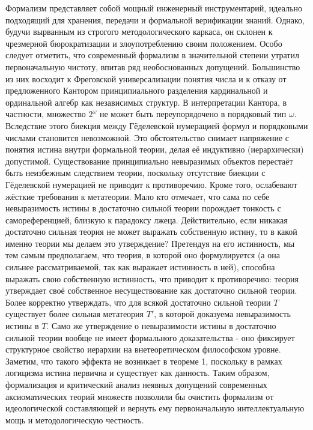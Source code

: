 \documentclass[12pt]{article}
\begin{document}
Формализм представляет собой мощный инженерный инструментарий, идеально подходящий для хранения, передачи и формальной верификации знаний. Однако, будучи вырванным из строгого методологического каркаса, он склонен к чрезмерной бюрократизации и злоупотреблению своим положением. Особо следует отметить, что современный формализм в значительной степени утратил первоначальную чистоту, впитав ряд необоснованных допущений. Большинство из них восходит к Фреговской универсализации понятия числа и к отказу от предложенного Кантором принципиального разделения кардинальной и ординальной алгебр как независимых структур. В интерпретации Кантора, в частности, множество $2^\omega$ не может быть переупорядочено в порядковый тип $\omega$. Вследствие этого биекция между Гёделевской нумерацией формул и порядковыми числами становится невозможной. Это обстоятельство снимает напряжение с понятия истина внутри формальной теории, делая её индуктивно (иерархически) допустимой. Существование принципиально невыразимых объектов перестаёт быть неизбежным следствием теории, поскольку отсутствие биекции с Гёделевской нумерацией не приводит к противоречию. Кроме того, ослабевают жёсткие требования к метатеории. Мало кто отмечает, что сама по себе невыразимость истины в достаточно сильной теории порождает тонкость с самореференцией, близкую к парадоксу лжеца. Действительно, если никакая достаточно сильная теория не может выражать собственную истину, то в какой именно теории мы делаем это утверждение? Претендуя на его истинность, мы тем самым предполагаем, что теория, в которой оно формулируется (а она сильнее рассматриваемой, так как выражает истинность в ней), способна выражать свою собственную истинность, что приводит к противоречию: теория утверждает своё собственное несуществование как достаточно сильной теории. Более корректно утверждать, что для всякой достаточно сильной теории $T$ существует более сильная метатеория $T'$, в которой доказуема невыразимость истины в $T$. Само же утверждение о невыразимости истины в достаточно сильной теории вообще не имеет формального доказательства - оно фиксирует структурное свойство иерархии на внетеоретическом философском уровне. Заметим, что такого эффекта не возникает в теореме 1, поскольку в рамках логицизма истина первична и существует как данность. Таким образом, формализация и критический анализ неявных допущений современных аксиоматических теорий множеств позволили бы очистить формализм от идеологической составляющей и вернуть ему первоначальную интеллектуальную мощь и методологическую честность.
\end{document}
